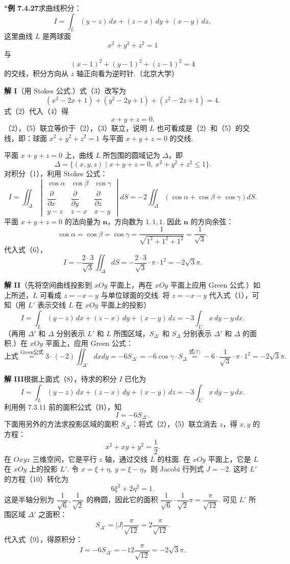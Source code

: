 \documentclass[UTF8, 12pt, fontset=fandol, oneside]{ctexart}
\providecommand{\xlongequal}[1]{\overset{#1}{=}}
\begin{document}
\noindent\textbf{$*$例 7.4.27}\quad 求曲线积分：
\[
I=\int_L(y-z)\,dx+(z-x)\,dy+(x-y)\,dz, \tag{1}
\]
这里曲线 $L$ 是两球面
\[
x^2+y^2+z^2=1 \tag{2}
\]
与
\[
(x-1)^2+(y-1)^2+(z-1)^2=4 \tag{3}
\]
的交线，积分方向从 $z$ 轴正向看为逆时针.（北京大学）

\noindent\textbf{解 I}\quad （用 Stokes 公式.）式（3）改写为
\[
(x^2-2x+1)+(y^2-2y+1)+(z^2-2z+1)=4. \tag{4}
\]
式（2）代入（4）得
\[
x+y+z=0. \tag{5}
\]
（2），（5）联立等价于（2），（3）联立，说明 $L$ 也可看成是（2）和（5）的交线，即：球面 $x^2+y^2+z^2=1$ 与平面 $x+y+z=0$ 的交线.

平面 $x+y+z=0$ 上，曲线 $L$ 所包围的圆域记为 $\Delta$，即
\[
\Delta=\{(x,y,z)\mid x+y+z=0,\ x^2+y^2+z^2\le1\}.
\]
对积分（1），利用 Stokes 公式：
\[
I=\iint_\Delta
\begin{vmatrix}
\cos\alpha & \cos\beta & \cos\gamma\\
\dfrac{\partial}{\partial x} & \dfrac{\partial}{\partial y} & \dfrac{\partial}{\partial z}\\
y-z & z-x & x-y
\end{vmatrix}dS
=-2\iint_\Delta(\cos\alpha+\cos\beta+\cos\gamma)dS. \tag{6}
\]
平面 $x+y+z=0$ 的法向量为 $\mathbf n$，方向数为 $1,1,1$. 因此 $\mathbf n$ 的方向余弦：
\[
\cos\alpha=\cos\beta=\cos\gamma=\frac1{\sqrt{1^2+1^2+1^2}}=\frac1{\sqrt3}. \tag{7}
\]
代入式（6），
\[
I=-\frac{2\cdot3}{\sqrt3}\iint_\Delta dS
=-\frac{2\cdot3}{\sqrt3}\cdot\pi\cdot1^2=-2\sqrt3\pi.
\]

\noindent\textbf{解 II}\quad （先将空间曲线投影到 $xOy$ 平面上，再在 $xOy$ 平面上应用 Green 公式.）如上所述，$L$ 可看成 $z=-x-y$ 与单位球面的交线. 将 $z=-x-y$ 代入式（1），可知（用 $L'$ 表示交线 $L$ 在 $xOy$ 平面上的投影）
\[
I=\int_L(y-z)\,dx+(z-x)\,dy+(x-y)\,dz
=-3\int_{L'}x\,dy-y\,dx. \tag{8}
\]
（再用 $\Delta'$ 和 $\Delta$ 分别表示 $L'$ 和 $L$ 所围区域，$S_{\Delta'}$ 和 $S_\Delta$ 分别表示 $\Delta'$ 和 $\Delta$ 的面积.）在 $xOy$ 平面上，应用 Green 公式：
\[
\text{上式}\xlongequal{\text{Green公式}}3\cdot(-2)\iint_{\Delta'}dxdy
=-6S_{\Delta'}=-6\cos\gamma\cdot S_\Delta
\xlongequal{\text{式(7)}}-6\cdot\frac1{\sqrt3}\cdot\pi\cdot1^2=-2\sqrt3\pi.
\]

\noindent\textbf{解 III}\quad 根据上面式（8），待求的积分 $I$ 已化为
\[
I=\int_L(y-z)\,dx+(z-x)\,dy+(x-y)\,dz=-3\int_{L'}x\,dy-y\,dx.
\]
利用例 7.3.11 前的面积公式（B），知
\[
I=-6S_{\Delta'}. \tag{9}
\]
下面用另外的方法求投影区域的面积 $S_{\Delta'}$：将式（2），（5）联立消去 $z$，得 $x,y$ 的方程：
\[
x^2+xy+y^2=\frac12. \tag{10}
\]
在 $Oxyz$ 三维空间，它是平行 $z$ 轴，通过交线 $L$ 的柱面. 在 $xOy$ 平面上，它是 $L$ 在 $xOy$ 上的投影 $L'$. 令 $x=\xi+\eta,\ y=\xi-\eta$，则 Jacobi 行列式 $J=-2$. 这时 $L'$ 的方程（10）转化为
\[
6\xi^2+2\eta^2=1. \tag{11}
\]
这是半轴分别为 $\dfrac1{\sqrt6},\dfrac1{\sqrt2}$ 的椭圆，因此它的面积 $\dfrac1{\sqrt6}\cdot\dfrac1{\sqrt2}\pi=\dfrac\pi{\sqrt{12}}$. 可见 $L'$ 所围区域 $\Delta'$ 之面积：
\[
S_{\Delta'}=|J|\frac\pi{\sqrt{12}}=2\frac\pi{\sqrt{12}}.
\]
代入式（9），得原积分：
\[
I=-6S_{\Delta'}=-12\frac\pi{\sqrt{12}}=-2\sqrt3\pi.
\]
\end{document}
